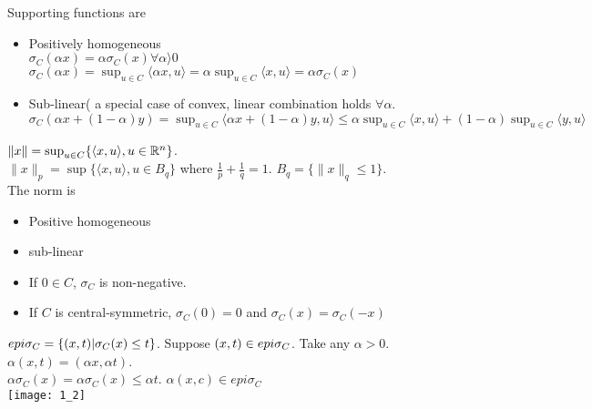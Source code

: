 Supporting functions are
\begin{itemize}
\item Positively homogeneous\\
$\sigma_C(\alpha x) = \alpha \sigma_C(x) \forall \alpha \rangle  0$ \\
$\sigma_C(\alpha x ) = \sup_{u \in C} \langle \alpha x, u\rangle  = \alpha \sup_{u \in C} \langle x, u\rangle  = \alpha \sigma_C(x)$
\item Sub-linear( a special case of convex, linear combination holds $\forall \alpha$.\\
$\sigma_C(\alpha x + (1 - \alpha) y ) = \sup_{u \in C} \langle \alpha x + (1 - \alpha) y,u\rangle  \le \alpha\sup_{u \in C}\langle x,u\rangle  + (1 - \alpha)\sup_{u \in C}\langle y,u\rangle  $
\end{itemize}
\begin{example}[L2-norm]
$\| x \| = \sup_{u \in C} \{ \langle x, u \rangle, u \in \mathbb{R}^n \}$.\\
$\|x \|_p = \sup \{ \langle x, u \rangle, u \in B_q \}$ where $\frac{1}{p} + \frac{1}{q} = 1$. $B_q = \{ \|x \|_q \le 1\}$.\\
The norm is 
\begin{itemize}
\item Positive homogeneous
\item sub-linear
\item If $0 \in C$, $\sigma_C$ is non-negative.
\item If $C$ is central-symmetric, $\sigma_C(0) = 0$ and $\sigma_C(x) = \sigma_C(-x)$
\end{itemize}
\end{example}

\begin{fact}
$epi \space \sigma_C = \{ (x,t) | \sigma_C(x) \le t\}$.
Suppose $(x,t) \in epi \space \sigma_C$. Take any  $\alpha > 0$. $\alpha(x,t) = (\alpha x, \alpha t)$.\\
$\alpha \sigma_C(x) = \alpha \sigma_C(x) \le \alpha t$. $\alpha(x,c) \in epi 
\sigma_C$\\
\texttt{[image: 1\_2]}
\end{fact}

